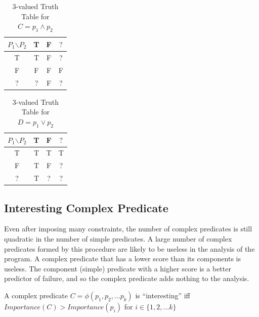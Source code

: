 \begin{table}
\caption{3-valued Truth Table for $C = p_1 \wedge p_2$}
\label{tab:and}
\centering
\scriptsize
  
\begin{tabular}{c|ccc}
  $P_1$$\backslash$$P_2$ & T & F & $?$ \\
  \hline
  T & T & F & ? \\
  F & F & F & F \\
  ? & ? & F & ? \\
\end{tabular}
\end{table}


\begin{table}
\caption{3-valued Truth Table for $D = p_1 \vee p_2$}
\label{tab:or}
\centering
\scriptsize
  
  \centering
  \begin{tabular}{c|ccc}
  $P_1$$\backslash$$P_2$ & T & F & $?$ \\
  \hline
  T & T & T & T \\
  F & T & F & ? \\
  ? & T & ? & ? \\
\end{tabular}
\end{table}

\subsection{Interesting Complex Predicate}

Even after imposing many constraints, the number of complex predicates is still quadratic in the number of simple predicates.  A large number of complex predicates formed by this procedure are likely to be useless in the analysis of the program.  A complex predicate that has a lower score than its components is useless.  The component (simple) predicate with a higher score is a better predictor of failure, and so the complex predicate adds nothing to the analysis.

\begin{defn}
\label{dfn3}
A complex predicate $C = \phi(p_1, p_2, \ldots p_k)$ is ``interesting'' iff $Importance(C) > Importance(p_i)$ for $i \in \{1, 2, \ldots k\}$
\end{defn}

